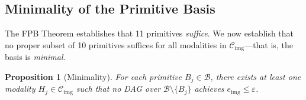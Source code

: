 \documentclass[11pt]{article}
\newtheorem{proposition}[theorem]{Proposition}
\theoremstyle{definition}
\begin{document}
\subsection{Minimality of the Primitive Basis}
\label{sec:minimality}

The FPB Theorem establishes that 11 primitives \emph{suffice}.
We now establish that no proper subset of 10 primitives suffices for all
modalities in $\mathcal{C}_{\mathrm{img}}$---that is, the basis is \emph{minimal}.

\begin{proposition}[Minimality]
\label{prop:minimality}
For each primitive $B_j \in \mathcal{B}$, there exists at least one modality
$H_j \in \mathcal{C}_{\mathrm{img}}$ such that no DAG over
$\mathcal{B} \setminus \{B_j\}$ achieves
$e_{\mathrm{img}} \leq \varepsilon$.
\end{proposition}
\end{document}
